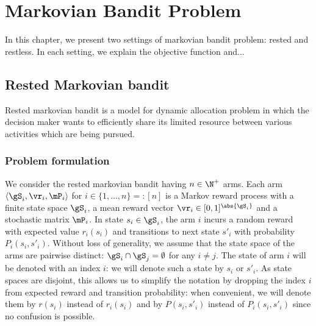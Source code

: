 \begingroup
\let\clearpage\relax

\chapter{Markovian Bandit Problem}
\label{ch:mb}

In this chapter, we present two settings of markovian bandit problem: rested and restless.
In each setting, we explain the objective function and...

\section{Rested Markovian bandit}
\label{sec:rested_mab}

Rested markovian bandit is a model for dynamic allocation problem in which the decision maker wants to efficiently share its limited resource between various activities which are being pursued.


\subsection{Problem formulation}
\label{subsec:rested_formul}

We consider the rested markovian bandit having $n\in\N^+$ arms.
Each arm $\langle\gS_i, \vr_i, \mP_i\rangle$ for $i\in\{1,\dots,n\}=:[n]$ is a Markov reward process with a finite state space $\gS_i$, a mean reward vector $\vr_i\in[0,1]^{\abs{\gS_i}}$ and a stochastic matrix $\mP_i$.
In state $s_i\in\gS_i$, the arm $i$ incurs a random reward with expected value $r_i(s_i)$ and transitions to next state $s'_i$ with probability $P_i(s_i,s'_i)$.
Without loss of generality, we assume that the state space of the arms are pairwise distinct: $\gS_i\cap\gS_j=\emptyset$ for any $i\neq j$.
The state of arm $i$ will be denoted with an index $i$: we will denote such a state by $s_i$ or $s'_i$.
As state spaces are disjoint, this allows us to simplify the notation by dropping the index $i$ from expected reward and transition probability: when convenient, we will denote them by $r(s_i)$ instead of $r_i(s_i)$ and by $P(s_i,s'_i)$ instead of $P_i(s_i,s'_i)$ since no confusion is possible.

